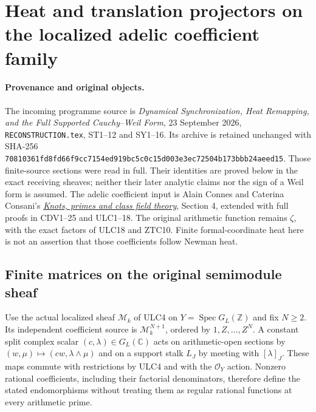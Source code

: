 \section{Heat and translation projectors on the localized adelic coefficient family}
\label{sec:cc-localized-shift}

\paragraph{Provenance and original objects.}
The incoming programme source is \emph{Dynamical Synchronization, Heat
Remapping, and the Full Supported Cauchy--Weil Form}, 23 September 2026,
\texttt{RECONSTRUCTION.tex}, ST1--12 and SY1--16. Its archive is retained
unchanged with SHA-256
\texttt{70810361fd8fd66f9cc7154ed919bc5c0c15d003e3ec72504b173bbb24aeed15}.
Those finite-source sections were read in full. Their identities are
proved below in the exact receiving sheaves; neither their later
analytic claims nor the sign of a Weil form is assumed. The adelic
coefficient input is Alain Connes and Caterina Consani's
\href{https://arxiv.org/abs/2501.06560v1}{\emph{Knots, primes and class
field theory}}, Section 4, extended with full proofs in CDV1--25 and
ULC1--18. The original arithmetic function remains $\zeta$, with
the exact factors of ULC18 and ZTC10. Finite formal-coordinate heat
here is not an assertion that those coefficients follow Newman heat.

\subsection{Finite matrices on the original semimodule sheaf}
Use the actual localized sheaf $\mathcal M_k$ of ULC4 on
$Y=\operatorname{Spec}G_L(\mathbb Z)$ and fix $N\ge2$.
Its independent coefficient source is $\mathcal M_k^{N+1}$,
ordered by $1,Z,\ldots,Z^N$. A constant split complex scalar
$(c,\lambda)\in G_L(\mathbb C)$ acts on arithmetic-open sections by
$(w,\mu)\mapsto(cw,\lambda\wedge\mu)$ and on a support stalk
$L_J$ by meeting with $[\lambda]_J$. These maps commute with
restrictions by ULC4 and with the $\mathcal O_Y$ action. Nonzero
rational coefficients, including their factorial denominators,
therefore define the stated endomorphisms without treating them
as regular rational functions at every arithmetic prime.


